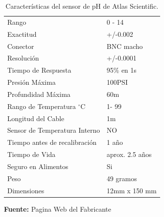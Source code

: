 \begin{table}[H]
\protect\caption[Características del sensor de pH de Atlas Scientific]{Características del sensor de pH de Atlas Scientific.}
\label{tab: caract_sondaph}
\begin{center}
\begin{tabular}{l l}
\hline
Rango    &  0 - 14\\
Exactitud      &  +/-0.002\\
Conector &  BNC macho\\
Resolución   &  +/-0.0001\\
Tiempo de Respuesta   &  95\% en 1s\\
Presión Máxima    &  100PSI\\
Profundidad Máxima	& 60m\\
Rango de Temperatura $^{\circ}$C	& 1- 99\\
Longitud del Cable	& 1m\\
Sensor de Temperatura Interno	& NO\\
Tiempo antes de recalibración	& 1 año\\
Tiempo de Vida	& aprox. 2.5 años\\
Seguro en Alimentos & Si\\
Peso & 49 gramos\\
Dimensiones & 12mm x 150 mm\\
\hline
\end{tabular}
\vspace{5mm}
\newline
\hfill
\textbf{Fuente: }Pagina Web del Fabricante\cite{atlasph}
\end{center}
\end{table} 

